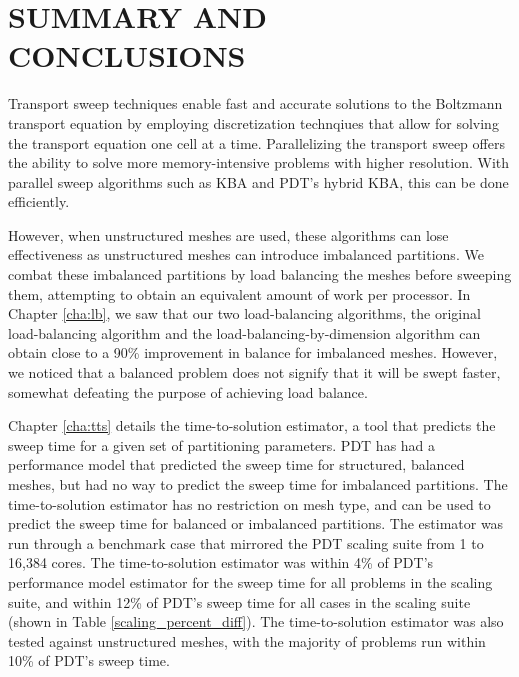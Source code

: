 %
%
%
%



\chapter{SUMMARY AND CONCLUSIONS \label{cha:Summary}}

Transport sweep techniques enable fast and accurate solutions to the Boltzmann transport equation by employing discretization technqiues that allow for solving the transport equation one cell at a time.
Parallelizing the transport sweep offers the ability to solve more memory-intensive problems with higher resolution. With parallel sweep algorithms such as KBA and PDT's hybrid KBA, this can be done efficiently.

However, when unstructured meshes are used, these algorithms can lose effectiveness as unstructured meshes can introduce imbalanced partitions.
We combat these imbalanced partitions by load balancing the meshes before sweeping them, attempting to obtain an equivalent amount of work per processor.
In Chapter \ref{cha:lb}, we saw that our two load-balancing algorithms, the original load-balancing algorithm and the load-balancing-by-dimension algorithm can obtain close to a 90\% improvement in balance for imbalanced meshes. However, we noticed that a balanced problem  does not signify that it will be swept faster, somewhat defeating the purpose of achieving load balance.

Chapter \ref{cha:tts} details the time-to-solution estimator, a tool that predicts the sweep time for a given set of partitioning parameters.
PDT has had a performance model that predicted the sweep time for structured, balanced meshes, but had no way to predict the sweep time for imbalanced partitions.
The time-to-solution estimator has no restriction on mesh type, and can be used to predict the sweep time for balanced or imbalanced partitions.
The estimator was run through a benchmark case that mirrored the PDT scaling suite from 1 to 16,384 cores.
The time-to-solution estimator was within 4\% of PDT's performance model estimator for the sweep time for all problems in the scaling suite, and within 12\% of PDT's sweep time for all cases in the scaling suite (shown in Table \ref{scaling_percent_diff}).
The time-to-solution estimator was also tested against unstructured meshes, with the majority of problems run within 10\% of PDT's sweep time.

